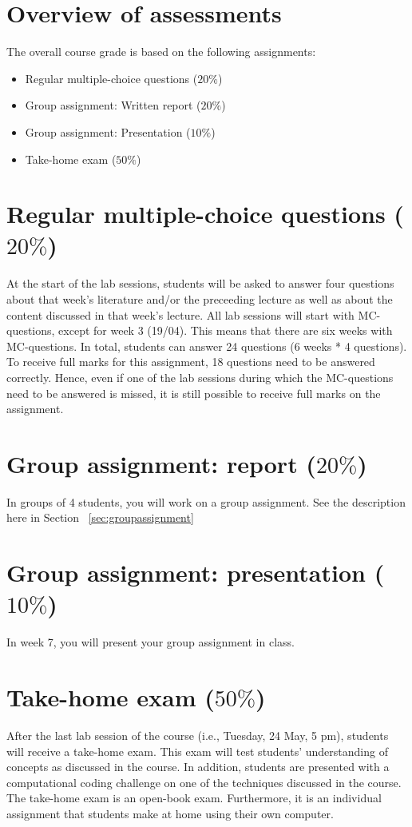 \documentclass[a4paper,10pt,twocolumn]{report}
\begin{document}
	\section{Overview of assessments}
	The overall course grade is based on the following assignments:
	\begin{itemize}
		\item Regular multiple-choice questions (\(20\%\))
		\item Group assignment: Written report (\(20\%\))
		\item Group assignment: Presentation (\(10\%\))
		\item Take-home exam (\(50\%\))
	\end{itemize}

\section{Regular multiple-choice questions ($20\%$)}
At the start of the lab sessions, students will be asked to answer four questions about that week's literature and/or the preceeding lecture as well as about the content discussed in that week's lecture. All lab sessions will start with MC-questions, except for week 3 (19/04). This means that there are six weeks with MC-questions. In total, students can answer 24 questions (6 weeks * 4 questions). To receive full marks for this assignment, 18 questions need to be answered correctly. Hence, even if one of the lab sessions during which the MC-questions need to be answered is missed, it is still possible to receive full marks on the assignment. 
	
	\section{Group assignment: report ($20\%$)}
In groups of 4 students, you will work on a group assignment. See the description here in Section ~\ref{sec:groupassignment}
	
	\section{Group assignment: presentation ($10\%$)}
In week 7, you will present your group assignment in class. 
	
	\section{Take-home exam ($50\%$)}
	After the last lab session of the course (i.e., Tuesday, 24 May, 5 pm), students will receive a take-home exam. This exam will test students' understanding of concepts as discussed in the course. In addition, students are presented with a computational coding challenge on one of the techniques discussed in the course. The take-home exam is an open-book exam. Furthermore, it is an individual assignment that students make at home using their own computer. 
\end{document}
